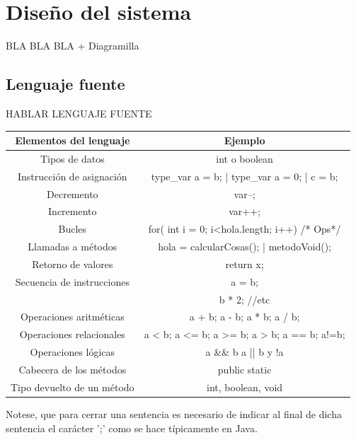 \documentclass[12pt,a4paper]{article}
\begin{document}
\section{Diseño del sistema}

BLA BLA BLA + Diagramilla

\clearpage
\subsection{Lenguaje fuente}
HABLAR LENGUAJE FUENTE


\begin{center}
\begin{tabular}{|c|c|}
	\hline 
	\textbf{Elementos del lenguaje} & \textbf{Ejemplo} \\ 
	\hline 
	Tipos de datos & int o boolean  \\
	\hline 
 	Instrucción de asignación & type\_var a = b; | type\_var a = 0; | c = b; \\
	\hline 
	Decremento & var--; \\ 
	\hline 
	Incremento & var++; \\
	\hline 
	Bucles  &  for( int i = 0; i<hola.length; i++){   /* Ops*/}  \\
	\hline
	Llamadas a métodos & hola = calcularCosas(); | metodoVoid(); \\

	\hline 
 	Retorno de valores &  return x;  \\ 
	\hline  
	Secuencia de instrucciones & a = b; \\
	&  b * 2; //etc \\
	\hline
	Operaciones aritméticas  &  a + b; a - b; a * b; a / b;  \\
	\hline
	Operaciones relacionales & a < b; a <= b; a >= b; a > b; a == b; a!=b;\\
	\hline
	Operaciones lógicas & a \&\& b  a || b y !a \\
	\hline
	Cabecera de los métodos & public static \\
	\hline
	Tipo devuelto de un método & int, boolean, void \\
	\hline
	
\end{tabular} 
\end{center}

Notese, que para cerrar una sentencia es necesario de indicar al final de dicha sentencia el carácter ';' como se hace típicamente en Java.
\end{document}

